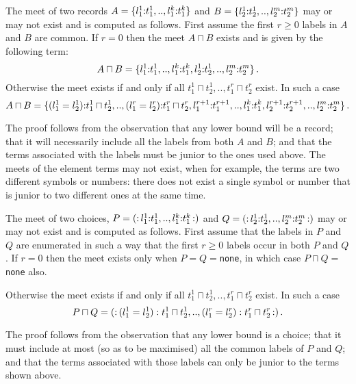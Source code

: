 \documentclass[11pt]{report}
\begin{document}
\begin{prop}
The meet of two records $A=\{l^1_1\hbox{\rm :}t_1^1,..,l^k_1\hbox{\rm :}t^k_1\}$ and
$B=\{l^1_2\hbox{\rm :}t^1_2,..,l^m_2\hbox{\rm :}t^m_2\}$ may or may not exist
and is computed as follows.
First assume the first $r\ge0$ labels in $A$ and $B$ are common.
If $r=0$ then the meet $A\sqcap B$ exists and is given by the following term:
\[
A\sqcap B = \{l^1_1\hbox{\rm :}t_1^1,..,l^{k}_1\hbox{\rm :}t^{k}_1, l^1_2\hbox{\rm :}t^1_2,..,l^{m}_2\hbox{\rm :}t^{m}_2\}\,.
\]
Otherwise the meet exists if and only if all $t^{1}_1\sqcap t^{1}_2,..,t^{r}_1\sqcap t^{r}_2$ exist. In such a case
\[
A\sqcap B = \{
(l^{1}_1=l^1_2)\hbox{\rm :}t^{1}_1\sqcap t^{1}_2
,..,(l^{r}_1=l^{r}_2)\hbox{\rm :}t^{r}_1\sqcap t^{r}_2,
l^{r+1}_1\hbox{\rm :}t^{r+1}_1,..,l^{k}_1\hbox{\rm :}t^{k}_1,
l^{r+1}_2\hbox{\rm :}t^{r+1}_2,..,l^{m}_2\hbox{\rm :}t^{m}_2
 \}\,.
\]
\end{prop}
The proof follows from the observation that any lower bound will be a record; that it will necessarily include all the labels from both $A$ and $B$; and that the terms associated with the labels must be
junior to the ones used above. The meets of the element terms may not exist, when for example,
the terms are two different symbols or numbers: there does not exist a single symbol or number that is junior to two different ones at the same time.


\begin{prop}
The meet of two choices, $P=\hbox{\rm (:}\,l^1_1\hbox{\rm :}t_1^1,..,l^k_1\hbox{\rm :}t^k_1\,\hbox{\rm :)}$
and $Q=\hbox{\rm (:}\,l^1_2\hbox{\rm :}t^1_2,..,l^m_2\hbox{\rm :}t^m_2\,\hbox{\rm :)}$ may or may not exist and is computed as follows.
First assume that the labels in $P$ and $Q$ are enumerated in such a way that
the first $r\ge0$ labels occur in both $P$ and $Q$. If $r=0$ then the  meet exists only when
$P=Q=$\verb"none", in which case $P\sqcap Q=$\verb"none" also.

Otherwise the meet exists if and only if all $t^{1}_1\sqcap t^{1}_2,..,t^{r}_1\sqcap t^{r}_2$ exist. In such a case
\[
P\sqcap Q=\hbox{\rm (:}\,(l^1_1=l^1_2):t^1_1\sqcap t^1_2,..,(l^r_1=l^r_2):t^r_1\sqcap t^r_2\,\hbox{\rm :)}\,.
\]

\end{prop}

The proof follows from the observation that any lower bound is a choice; that it must include at most
(so as to be maximised) all the common labels of $P$ and $Q$; and that the terms associated with those labels can only be junior to the terms shown above.
\end{document}
